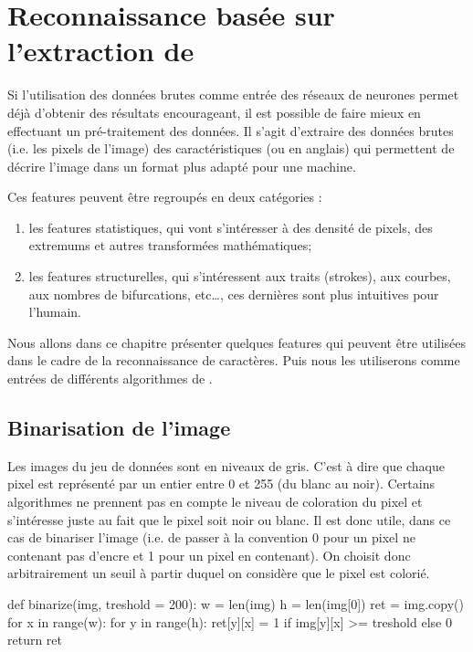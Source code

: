 
\chapter{Reconnaissance basée sur l'extraction de }
\label{chap:features}




Si l'utilisation des données brutes comme entrée des réseaux de neurones 
permet déjà d'obtenir des résultats encourageant, il est possible de faire 
mieux en effectuant un pré-traitement des données. 
Il s'agit d'extraire des données brutes (i.e.\/ les pixels de l'image) des 
caractéristiques (ou  en anglais) qui permettent de décrire 
l'image dans un format plus adapté pour une machine.

Ces features peuvent être regroupés en deux catégories : 
\begin{enumerate}
  \item les features statistiques, qui vont s'intéresser à des densité de pixels, 
  des extremums et autres transformées mathématiques;
  \item les features structurelles, qui s’intéressent aux traits (strokes), aux courbes,
  aux nombres de bifurcations, etc…, ces dernières sont plus intuitives pour l’humain.
\end{enumerate}

Nous allons dans ce chapitre présenter quelques features qui peuvent être 
utilisées dans le cadre de la reconnaissance de caractères. Puis nous les utiliserons 
comme entrées de différents algorithmes de .



\section{Binarisation de l'image}



Les images du jeu de données sont en niveaux de gris. 
C'est à dire que chaque pixel est représenté par un entier entre 0 
et 255 (du blanc au noir). 
Certains algorithmes ne prennent pas en compte le niveau de coloration 
du pixel et s'intéresse juste au fait que le pixel soit noir ou blanc. 
Il est donc utile, dans ce cas de binariser l'image (i.e.\/ de passer 
à la convention 0 pour un pixel ne contenant pas d'encre et 1 pour 
un pixel en contenant). 
On choisit donc arbitrairement un seuil à partir duquel on considère que 
le pixel est colorié.

\begin{codeblock}
def binarize(img, treshold = 200):
    w = len(img)
    h = len(img[0])
    ret = img.copy()
    for x in range(w):
        for y in range(h):
            ret[y][x] = 1 if img[y][x] >= treshold else 0
    return ret
\end{codeblock}

